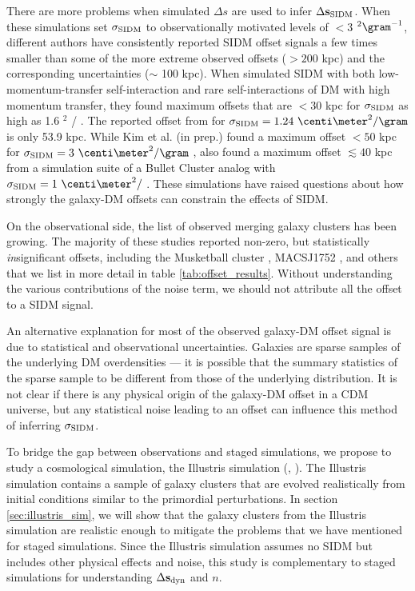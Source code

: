 There are more problems when simulated $\Delta s$ are used to infer
$\Delta {\bf s}_{{\rm SIDM}}$.  
When these simulations set $\sigma_{\rm SIDM}$ to observationally motivated 
levels of $< 3$ \centi\meter$^2 \gram^{-1}$, 
different authors have consistently reported SIDM offset signals  
a few times smaller than some of the more extreme observed offsets ($ > 200$ kpc) and 
the corresponding uncertainties ($\sim$ 100 kpc). 
When \cite{Kahlhoefer14} simulated SIDM with both low-momentum-transfer 
self-interaction 
and rare self-interactions of DM with high momentum transfer, they found maximum 
offsets that are $< 30$ kpc for $\sigma_{\rm SIDM}$ as high as 1.6
\centi\meter$^2$ / \gram.
The reported offset from \cite{Randall2008d}
for $\sigmaSIDM = 1.24~\centi\meter^2 / \gram$ is only 53.9 kpc. 
While Kim et al. (in prep.) found a maximum offset $< 50$ kpc for 
$\sigmaSIDM = 3~\centi\meter^2 / \gram$ ,
\cite{Robertson2016} also found a maximum offset $\lesssim 40$ kpc  
 from a simulation suite of a Bullet Cluster analog 
 with $\sigmaSIDM = 1~\centi\meter^2 /$ \gram.
These simulations have raised questions about how strongly the galaxy-DM offsets 
can constrain the effects of SIDM.

On the observational side, the list of observed merging galaxy 
clusters has been growing.
The majority of these studies reported non-zero,
but statistically {\it in}significant offsets, including the Musketball cluster
\citep{Dawson2013}, MACSJ1752 \citep{Jee2015}, 
and others that we list in more detail in table \ref{tab:offset_results}.
Without understanding the various contributions of the noise term, 
we should not attribute all the offset to a SIDM signal. 

An alternative explanation for most of the observed galaxy-DM offset signal is due to 
statistical and observational uncertainties. Galaxies are
sparse samples of the underlying DM overdensities --- it is possible that the 
summary statistics of the sparse sample to be different from those of the 
underlying distribution. It is not clear if there is any physical
origin of the galaxy-DM offset in a CDM universe, 
but any statistical noise leading to an offset can influence this method of 
inferring $\sigma_{\rm SIDM}$. 

To bridge the gap between observations and staged simulations, we propose to
study a cosmological simulation, the Illustris simulation
(\citealt{Vogelsberger2014}, \citealt{Genel2014a}). 
The Illustris simulation contains a sample of galaxy clusters that are evolved
realistically from initial conditions similar to the primordial
perturbations. In section \ref{sec:illustris_sim},
we will show that the galaxy clusters from the Illustris simulation 
are realistic enough to mitigate the problems that we have mentioned 
for staged simulations. Since the Illustris simulation assumes no SIDM but 
includes other physical effects and noise, 
this study is complementary to 
staged simulations for understanding $\Delta {\bf s}_{\rm dyn}$ and $n$. 

